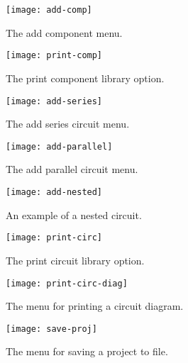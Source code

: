 \begin{figure}[h!]
  \begin{center}
    \texttt{[image: add-comp]}
  \end{center}
  \caption{The add component menu.}
  \label{fig:add-comp}
\end{figure}
\begin{figure}[h!]
  \begin{center}
    \texttt{[image: print-comp]}
  \end{center}
  \caption{The print component library option.}
  \label{fig:print-comp}
\end{figure}
\begin{figure}
  \begin{center}
    \texttt{[image: add-series]}
  \end{center}
  \caption{The add series circuit menu.}
  \label{fig:add-series}
\end{figure}
\begin{figure}
  \begin{center}
    \texttt{[image: add-parallel]}
  \end{center}
  \caption{The add parallel circuit menu.}
  \label{fig:add-parallel}
\end{figure}
\begin{figure}
  \begin{center}
    \texttt{[image: add-nested]}
  \end{center}
  \caption{An example of a nested circuit.}
  \label{fig:add-nested}
\end{figure}
\begin{figure}
  \begin{center}
    \texttt{[image: print-circ]}
  \end{center}
  \caption{The print circuit library option.}
  \label{fig:print-circ}
\end{figure}
\begin{figure}
  \begin{center}
    \texttt{[image: print-circ-diag]}
  \end{center}
  \caption{The menu for printing a circuit diagram.}
  \label{fig:print-diag}
\end{figure}
\begin{figure}
  \begin{center}
    \texttt{[image: save-proj]}
  \end{center}
  \caption{The menu for saving a project to file.}
  \label{fig:save}
\end{figure}
